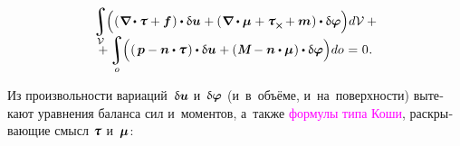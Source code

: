 \begin{otherlanguage}{russian}
\nopagebreak\vspace{-0.33em}
\begin{multline*}\label{virtualworkprinciple.2:micropolarcontinuum}
\integral\displaylimits_{\mathcal{V}} \hspace{-0.64ex} \left(^{\mathstrut} ( \hspace{.12ex} \boldnabla \hspace{-0.1ex} \dotp \forcestresstensor + \bm{f} \hspace{.12ex} ) \dotp \variation{\fieldofdisplacements} \hspace{.1ex}
+ ( \hspace{.12ex} \boldnabla \dotp \couplestresstensor \hspace{.1ex} + \forcestresstensor_{\Xcompanion} \hspace{-0.1ex} + \bm{m} \hspace{.1ex} ) \dotp \variation{\fieldofrotations} \right) \hspace{-0.32ex} d\mathcal{V} \hspace{0.5ex} + \\[-1.1em]
+ \integral\displaylimits_o \hspace{-0.64ex} \left(^{\mathstrut} ( \hspace{.32ex} \bm{p} - \bm{n} \dotp \forcestresstensor \hspace{.2ex} ) \dotp \variation{\fieldofdisplacements} \hspace{.1ex}
+ ( \hspace{.1ex} \mathboldM - \bm{n} \dotp \couplestresstensor \hspace{.1ex} ) \dotp \variation{\fieldofrotations} \right) \hspace{-0.32ex} do \hspace{0.12ex} = \hspace{0.1ex} 0 \hspace{0.1ex}.
\end{multline*}

Из произвольности вариаций~$\updelta\hspace{-0.1ex}\bm{u}$ и~$\updelta\hspace{-0.1ex}\bm{\varphi}$ (и~в~объёме, и~на~поверхности) вытекают уравнения баланса сил и~моментов, а~также \textcolor{magenta}{формулы типа Коши}, %
раскрывающие смысл $\forcestresstensor$ и~$\bm{\mu}$:


\end{otherlanguage}
